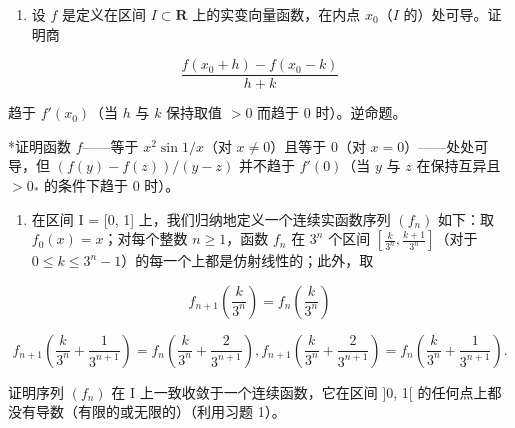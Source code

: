 \begin{enumerate}
\def\labelenumi{\arabic{enumi})}
\tightlist
\item
  设 \(f\) 是定义在区间 \(I \subset \mathbf{R}\) 上的实变向量函数，在内点 \(x_0\)（\(I\) 的）处可导。证明商
\end{enumerate}

\[
\frac {f (x _ {0} + h) - f (x _ {0} - k)}{h + k}
\]

趋于 \(f'(x_0)\)（当 \(h\) 与 \(k\) 保持取值 \(> 0\) 而趋于 0 时）。逆命题。

*证明函数 \(f\)——等于 \(x^2 \sin 1/x\)（对 \(x \neq 0\)）且等于 0（对 \(x = 0\)）——处处可导，但 \((f(y) - f(z)) / (y - z)\) 并不趋于 \(f'(0)\)（当 \(y\) 与 \(z\) 在保持互异且 \(>0_*\) 的条件下趋于 0 时）。

\begin{enumerate}
\def\labelenumi{\arabic{enumi})}
\setcounter{enumi}{1}
\tightlist
\item
  在区间 I = {[}0, 1{]} 上，我们归纳地定义一个连续实函数序列 \((f_{n})\) 如下：取 \(f_{0}(x) = x\)；对每个整数 \(n \geqslant 1\)，函数 \(f_{n}\) 在 \(3^{n}\) 个区间 \(\left[\frac{k}{3^{n}}, \frac{k+1}{3^{n}}\right]\)（对于 \(0 \leqslant k \leqslant 3^{n}-1\)）的每一个上都是仿射线性的；此外，取
\end{enumerate}

\[
f _ {n + 1} \left(\frac {k}{3 ^ {n}}\right) = f _ {n} \left(\frac {k}{3 ^ {n}}\right)
\]

\[
f _ {n + 1} \left(\frac {k}{3 ^ {n}} + \frac {1}{3 ^ {n + 1}}\right) = f _ {n} \left(\frac {k}{3 ^ {n}} + \frac {2}{3 ^ {n + 1}}\right), f _ {n + 1} \left(\frac {k}{3 ^ {n}} + \frac {2}{3 ^ {n + 1}}\right) = f _ {n} \left(\frac {k}{3 ^ {n}} + \frac {1}{3 ^ {n + 1}}\right).
\]

证明序列 \((f_{n})\) 在 I 上一致收敛于一个连续函数，它在区间 {]}0, 1{[} 的任何点上都没有导数（有限的或无限的）（利用习题 1）。

